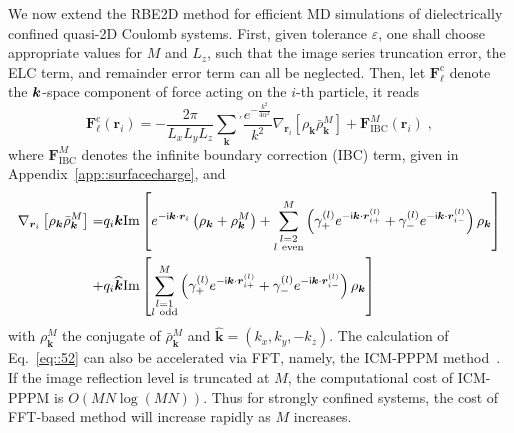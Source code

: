 We now extend the RBE2D method for efficient MD simulations of dielectrically confined quasi-2D Coulomb systems. 
First, given tolerance $\varepsilon$, one shall choose appropriate values for $M$ and $L_z$, such that the image series truncation error, the ELC term, and remainder error term can all be neglected. Then, let $\bm{F}_{\ell}^{\text{c}}$ denote the $\boldsymbol{k}$-space component of force acting on the $i$-th particle, it reads
\begin{equation}\label{eq::52}
\bm{F}_{\ell}^{\text{c}}(\bm{r}_i)=-\frac{2\pi}{L_xL_yL_z}\sum_{\bm{k}}{}^{\prime}\frac{e^{-\frac{k^2}{4\alpha^2}}}{k^2}\nabla_{\bm{r}_i}\left[\rho_{\bm{k}}\bar{\rho}_{\bm{k}}^{M}\right]+\bm{F}_{\text{IBC}}^{M}(\bm{r}_i)\;,%
\end{equation}
where $\bm{F}_{\text{IBC}}^{M}$ denotes the infinite boundary correction (IBC) term, given in Appendix~\ref{app::surfacecharge}, and
\begin{equation}\label{eq::rhorhoM}
\begin{split}
\nabla_{\bm{r}_i}\left[\rho_{\bm{k}}\bar{\rho}_{\bm{k}}^{M}\right]=&q_i\bm{k}\text{Im}\left[e^{-\i\bm{k}\cdot\bm{r}_i}\left(\rho_{\bm{k}}+\rho_{\bm{k}}^{M}\right)+\sum_{\substack{l=2\\ l\ \text{even}}}^{M}\left(\gamma_{+}^{(l)}e^{-\i\bm{k}\cdot\bm{r}_{i+}^{(l)}}+\gamma_{-}^{(l)}e^{-\i\bm{k}\cdot\bm{r}_{i-}^{(l)}}\right)\rho_{\bm{k}}\right]\\
+&q_i\widehat{\bm{k}}\text{Im}\left[\sum_{\substack{l=1\\ l\ \text{odd}}}^{M}\left(\gamma_{+}^{(l)}e^{-\i\bm{k}\cdot\bm{r}_{i+}^{(l)}}+\gamma_{-}^{(l)}e^{-\i\bm{k}\cdot\bm{r}_{i-}^{(l)}}\right)\rho_{\bm{k}}\right]
\end{split}
\end{equation}
with $\rho_{\bm{k}}^{M}$ the conjugate of $\bar{\rho}_{\bm{k}}^{M}$ and $\widehat{\bm{k}}=(k_x,k_y,-k_z)$. The calculation of Eq.~\eqref{eq::52} can also be accelerated via FFT, namely, the ICM-PPPM method~\cite{yuan2021particle}. 
If the image reflection level is truncated at $M$, the computational cost of ICM-PPPM is $O(MN \log(MN))$. Thus for strongly confined systems, the cost of FFT-based method will increase rapidly as $M$ increases.

